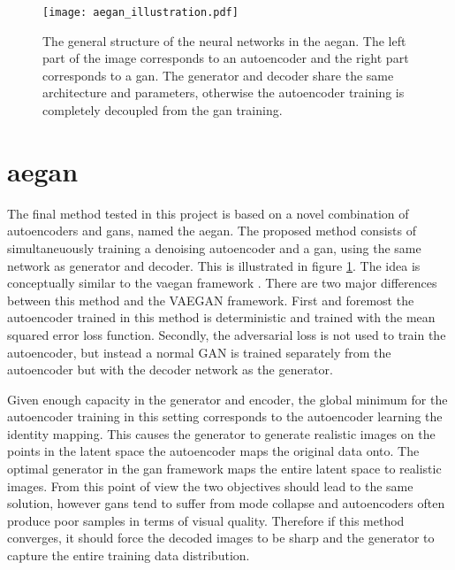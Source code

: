 \begin{figure}[t]
    \centering
    \texttt{[image: aegan\_illustration.pdf]}
    \caption{The general structure of the neural networks in the \acrlong{aegan}. The left part of the image corresponds to an autoencoder and the right part corresponds to a \acrshort{gan}. The generator and decoder share the same architecture and parameters, otherwise the autoencoder training is completely decoupled from the \acrshort{gan} training.}
    \label{fig:aegan}
\end{figure}

\section{\acrlong{aegan}}
The final method tested in this project is based on a novel combination of autoencoders and \acrshort{gans}, named the \acrfull{aegan}. The proposed method consists of simultaneuously training a denoising autoencoder and a \acrshort{gan}, using the same network as generator and decoder. This is illustrated in figure \ref{fig:aegan}. The idea is conceptually similar to the \acrshort{vaegan} framework \parencite{LarsenSW15autoencodingbeyond}. There are two major differences between this method and the VAEGAN framework. First and foremost the autoencoder trained in this method is deterministic and trained with the mean squared error loss function. Secondly, the adversarial loss is not used to train the autoencoder, but instead a normal GAN is trained separately from the autoencoder but with the decoder network as the generator. 

Given enough capacity in the generator and encoder, the global minimum for the autoencoder training in this setting corresponds to the autoencoder learning the identity mapping. This causes the generator to generate realistic images on the points in the latent space the autoencoder maps the original data onto. The optimal generator in the \acrshort{gan} framework maps the entire latent space to realistic images. From this point of view the two objectives should lead to the same solution, however \acrshort{gans} tend to suffer from mode collapse and autoencoders often produce poor samples in terms of visual quality. Therefore if this method converges, it should force the decoded images to be sharp and the generator to capture the entire training data distribution. 

